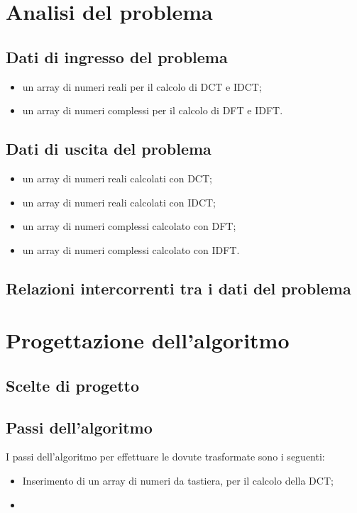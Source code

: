 \documentclass{report}
\begin{document}
	\chapter{Analisi del problema}

	
	\section{Dati di ingresso del problema}
	
	\begin{itemize}
		\item un array di numeri reali per il calcolo di DCT e IDCT;
		\item un array di numeri complessi per il calcolo di DFT e IDFT.
	\end{itemize}
	\section{Dati di uscita del problema}
	\begin{itemize}
		\item un array di numeri reali calcolati con DCT;
		\item un array di numeri reali calcolati con IDCT;
		\item un array di numeri complessi calcolato con DFT;
		\item un array di numeri complessi calcolato con IDFT.
	\end{itemize}
	\section{Relazioni intercorrenti tra i dati del problema}

	
	\chapter{Progettazione dell'algoritmo}
	\section{Scelte di progetto}

	\section{Passi dell'algoritmo}
	I passi dell'algoritmo per effettuare le dovute trasformate sono i seguenti:
	\begin{itemize}
		\item Inserimento di un array di numeri da tastiera, per il calcolo della DCT;
		\item 
	\end{itemize}
	
\end{document}
